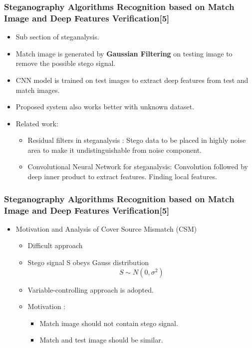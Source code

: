 \documentclass{beamer} %
\theoremstyle{definition} %
\begin{document}
\begin{frame}
\frametitle{Steganography Algorithms Recognition based on Match Image and Deep Features Verification[5] }
\begin{itemize}
	\item Sub section of steganalysis.
	\item Match image is generated by \textbf{Gaussian Filtering} on testing image to remove the possible stego signal.
	\item CNN model is trained on test images to extract deep features from test and match images.
	\item Proposed system also works better with unknown dataset.
	\item Related work:
	\begin{itemize}
		\item Residual filters in steganalysis : Stego data to be placed in highly noise area to make it undistinguishable from noise component.
		\item Convolutional Neural Network for steganalysis: Convolution followed by deep inner product to extract features.
		Finding local features.
	\end{itemize}
	
\end{itemize}
\end{frame}


\begin{frame}
\frametitle{Steganography Algorithms Recognition based on Match Image and Deep Features Verification[5] }
\begin{itemize}
\item Motivation and Analysis of Cover Source Mismatch (CSM)
\begin{itemize}
	\item Difficult approach 
	\item Stego signal S obeys Gauss distribution
	\begin{equation}
	S \sim N (0,\sigma^2)
	\end{equation}
	\item Variable-controlling approach is adopted.
	\item Motivation :
	\begin{itemize}
		\item Match image should not contain stego signal.
		\item Match and test image should be similar.
	\end{itemize}
\end{itemize}
\end{itemize}
\end{frame}
\end{document}
